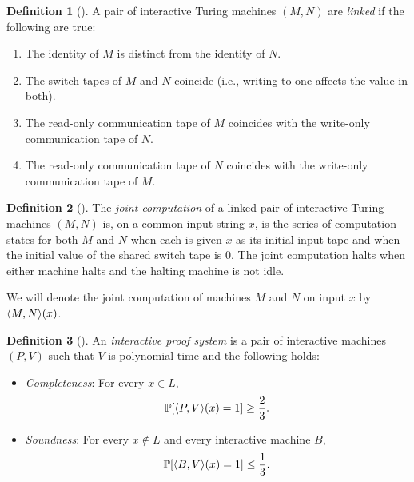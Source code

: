 \documentclass[english]{reedthesis}
\theoremstyle{plain}
\theoremstyle{definition}
\newtheorem{defn}[defn]{Definition}
\theoremstyle{remark}
\DeclarePairedDelimiter{\ang}{\langle}{\rangle}
\begin{document}
\begin{defn}[{\cite[Def.\ 4.2.2]{Go01}}]\label{def:linked-tms}
  A pair of interactive Turing machines $(M, N)$ are \emph{linked} if the
  following are true:
  \begin{enumerate}
    \item The identity of $M$ is distinct from the identity of $N$.
    \item The switch tapes of $M$ and $N$ coincide (i.e., writing to one affects
          the value in both).
    \item The read-only communication tape of $M$ coincides with the write-only
          communication tape of $N$.
    \item The read-only communication tape of $N$ coincides with the write-only
          communication tape of $M$.
  \end{enumerate}
\end{defn}

\begin{defn}[{\cite[Def.\ 4.2.2]{Go01}}]\label{def:joint-comp}
  The \emph{joint computation} of a linked pair of interactive Turing machines
  $(M, N)$ is, on a common input string $x$, is the series of computation states
  for both $M$ and $N$ when each is given $x$ as its initial input tape and when
  the initial value of the shared switch tape is $0$. The joint computation
  halts when either machine halts and the halting machine is not idle.
\end{defn}

We will denote the joint computation of machines $M$ and $N$ on input $x$ by
$\ang{M, N}(x)$. %

\begin{defn}[{\cite[Def.\ 4.2.4]{Go01}}]\label{def:ips}
  An \emph{interactive proof system} is a pair of interactive machines $(P, V)$
  such that $V$ is polynomial-time and the following holds:
  \begin{itemize}
    \item \emph{Completeness}: For every $x \in L$,
          \[
            \mathbb{P}[\ang{P, V}(x) = 1] \ge \frac{2}{3}.
          \]
    \item \emph{Soundness}: For every $x \notin L$ and every interactive machine $B$,
          \[
            \mathbb{P}[\ang{B, V}(x) = 1] \le \frac{1}{3}.
          \]
  \end{itemize}
\end{defn}
\end{document}
